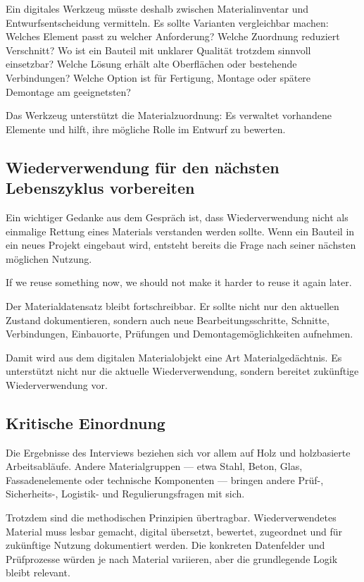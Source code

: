 Ein digitales Werkzeug müsste deshalb zwischen Materialinventar und Entwurfsentscheidung vermitteln. Es sollte Varianten vergleichbar machen: Welches Element passt zu welcher Anforderung? Welche Zuordnung reduziert Verschnitt? Wo ist ein Bauteil mit unklarer Qualität trotzdem sinnvoll einsetzbar? Welche Lösung erhält alte Oberflächen oder bestehende Verbindungen? Welche Option ist für Fertigung, Montage oder spätere Demontage am geeignetsten?

Das Werkzeug unterstützt die Materialzuordnung: Es verwaltet vorhandene Elemente und hilft, ihre mögliche Rolle im Entwurf zu bewerten.

\subsection{Wiederverwendung für den nächsten Lebenszyklus vorbereiten}

Ein wichtiger Gedanke aus dem Gespräch ist, dass Wiederverwendung nicht als einmalige Rettung eines Materials verstanden werden sollte. Wenn ein Bauteil in ein neues Projekt eingebaut wird, entsteht bereits die Frage nach seiner nächsten möglichen Nutzung.

\begin{Blockquote}
If we reuse something now, we should not make it harder to reuse it again later.
\end{Blockquote}

Der Materialdatensatz bleibt fortschreibbar. Er sollte nicht nur den aktuellen Zustand dokumentieren, sondern auch neue Bearbeitungsschritte, Schnitte, Verbindungen, Einbauorte, Prüfungen und Demontagemöglichkeiten aufnehmen.

Damit wird aus dem digitalen Materialobjekt eine Art Materialgedächtnis. Es unterstützt nicht nur die aktuelle Wiederverwendung, sondern bereitet zukünftige Wiederverwendung vor.

\subsection{Kritische Einordnung}

Die Ergebnisse des Interviews beziehen sich vor allem auf Holz und holzbasierte Arbeitsabläufe. Andere Materialgruppen — etwa Stahl, Beton, Glas, Fassadenelemente oder technische Komponenten — bringen andere Prüf-, Sicherheits-, Logistik- und Regulierungsfragen mit sich.

Trotzdem sind die methodischen Prinzipien übertragbar. Wiederverwendetes Material muss lesbar gemacht, digital übersetzt, bewertet, zugeordnet und für zukünftige Nutzung dokumentiert werden. Die konkreten Datenfelder und Prüfprozesse würden je nach Material variieren, aber die grundlegende Logik bleibt relevant.

